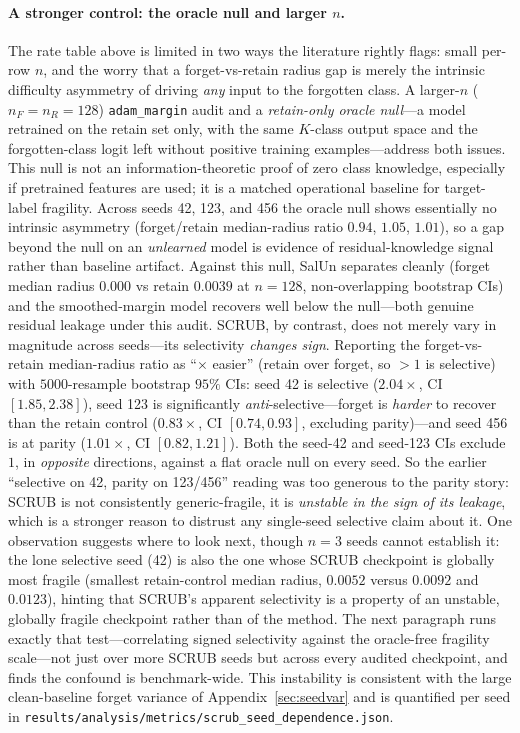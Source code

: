 \documentclass[11pt]{article}
\begin{document}
\paragraph{A stronger control: the oracle null and larger $n$.} The rate table above is limited in two ways the literature rightly flags: small per-row $n$, and the worry that a forget-vs-retain radius gap is merely the intrinsic difficulty asymmetry of driving \emph{any} input to the forgotten class. A larger-$n$ ($n_F = n_R = 128$) \texttt{adam\_margin} audit and a \emph{retain-only oracle null}---a model retrained on the retain set only, with the same $K$-class output space and the forgotten-class logit left without positive training examples---address both issues. This null is not an information-theoretic proof of zero class knowledge, especially if pretrained features are used; it is a matched operational baseline for target-label fragility. Across seeds 42, 123, and 456 the oracle null shows essentially no intrinsic asymmetry (forget/retain median-radius ratio $0.94$, $1.05$, $1.01$), so a gap beyond the null on an \emph{unlearned} model is evidence of residual-knowledge signal rather than baseline artifact. Against this null, SalUn separates cleanly (forget median radius $0.000$ vs retain $0.0039$ at $n{=}128$, non-overlapping bootstrap CIs) and the smoothed-margin model recovers well below the null---both genuine residual leakage under this audit. SCRUB, by contrast, does not merely vary in magnitude across seeds---its selectivity \emph{changes sign}. Reporting the forget-vs-retain median-radius ratio as ``$\times$ easier'' (retain over forget, so $>1$ is selective) with $5000$-resample bootstrap $95\%$ CIs: seed 42 is selective ($2.04\times$, CI $[1.85,2.38]$), seed 123 is significantly \emph{anti}-selective---forget is \emph{harder} to recover than the retain control ($0.83\times$, CI $[0.74,0.93]$, excluding parity)---and seed 456 is at parity ($1.01\times$, CI $[0.82,1.21]$). Both the seed-42 and seed-123 CIs exclude $1$, in \emph{opposite} directions, against a flat oracle null on every seed. So the earlier ``selective on 42, parity on 123/456'' reading was too generous to the parity story: SCRUB is not consistently generic-fragile, it is \emph{unstable in the sign of its leakage}, which is a stronger reason to distrust any single-seed selective claim about it. One observation suggests where to look next, though $n=3$ seeds cannot establish it: the lone selective seed (42) is also the one whose SCRUB checkpoint is globally most fragile (smallest retain-control median radius, $0.0052$ versus $0.0092$ and $0.0123$), hinting that SCRUB's apparent selectivity is a property of an unstable, globally fragile checkpoint rather than of the method. The next paragraph runs exactly that test---correlating signed selectivity against the oracle-free fragility scale---not just over more SCRUB seeds but across every audited checkpoint, and finds the confound is benchmark-wide. This instability is consistent with the large clean-baseline forget variance of Appendix~\ref{sec:seedvar} and is quantified per seed in \texttt{results/analysis/metrics/scrub\_seed\_dependence.json}.
\end{document}

